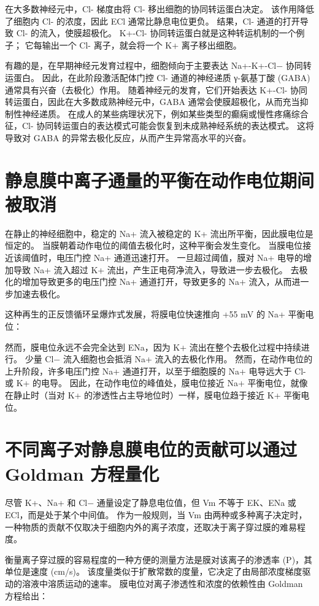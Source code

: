 在大多数神经元中，Cl- 梯度由将 Cl- 移出细胞的协同转运蛋白决定。 该作用降低了细胞内 Cl- 的浓度，因此 ECl 通常比静息电位更负。 结果，Cl- 通道的打开导致 Cl- 的流入，使膜超极化。 K+-Cl- 协同转运蛋白就是这种转运机制的一个例子； 它每输出一个 Cl- 离子，就会将一个 K+ 离子移出细胞。

有趣的是，在早期神经元发育过程中，细胞倾向于主要表达 Na+-K+-Cl− 协同转运蛋白。 因此，在此阶段激活配体门控 Cl- 通道的神经递质 γ-氨基丁酸 (GABA) 通常具有兴奋（去极化）作用。 随着神经元的发育，它们开始表达 K+-Cl- 协同转运蛋白，因此在大多数成熟神经元中，GABA 通常会使膜超极化，从而充当抑制性神经递质。 在成人的某些病理状况下，例如某些类型的癫痫或慢性疼痛综合征，Cl- 协同转运蛋白的表达模式可能会恢复到未成熟神经系统的表达模式。 这将导致对 GABA 的异常去极化反应，从而产生异常高水平的兴奋。


\section{静息膜中离子通量的平衡在动作电位期间被取消}

在静止的神经细胞中，稳定的 Na+ 流入被稳定的 K+ 流出所平衡，因此膜电位是恒定的。 当膜朝着动作电位的阈值去极化时，这种平衡会发生变化。 当膜电位接近该阈值时，电压门控 Na+ 通道迅速打开。 一旦超过阈值，膜对 Na+ 电导的增加导致 Na+ 流入超过 K+ 流出，产生正电荷净流入，导致进一步去极化。 去极化的增加导致更多的电压门控 Na+ 通道打开，导致更多的 Na+ 流入，从而进一步加速去极化。

这种再生的正反馈循环呈爆炸式发展，将膜电位快速推向 +55 mV 的 Na+ 平衡电位：

然而，膜电位永远不会完全达到 ENa，因为 K+ 流出在整个去极化过程中持续进行。 少量 Cl− 流入细胞也会抵消 Na+ 流入的去极化作用。 然而，在动作电位的上升阶段，许多电压门控 Na+ 通道打开，以至于细胞膜的 Na+ 电导远大于 Cl- 或 K+ 的电导。 因此，在动作电位的峰值处，膜电位接近 Na+ 平衡电位，就像在静止时（当对 K+ 的渗透性占主导地位时）一样，膜电位趋于接近 K+ 平衡电位。

\section{不同离子对静息膜电位的贡献可以通过 Goldman 方程量化}
尽管 K+、Na+ 和 Cl− 通量设定了静息电位值，但 Vm 不等于 EK、ENa 或 ECl，而是处于某个中间值。 作为一般规则，当 Vm 由两种或多种离子决定时，一种物质的贡献不仅取决于细胞内外的离子浓度，还取决于离子穿过膜的难易程度。

衡量离子穿过膜的容易程度的一种方便的测量方法是膜对该离子的渗透率 (P)，其单位是速度 (cm/s)。 该度量类似于扩散常数的度量，它决定了由局部浓度梯度驱动的溶液中溶质运动的速率。 膜电位对离子渗透性和浓度的依赖性由 Goldman 方程给出：

